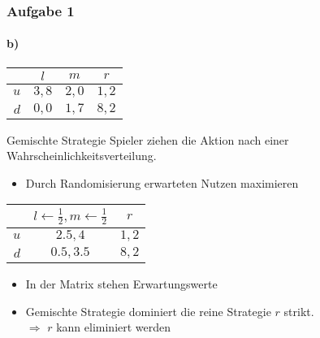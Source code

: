 \documentclass{beamer}
\begin{document}
\begin{frame}
	\frametitle{Aufgabe 1}
	\framesubtitle{b)}

	\centering
	\begin{tabular}{r|c|c|c|}
		& $l$ & $m$ & $r$ \\
		\hline
		$u$ & $3, 8$ & $2, 0$ & $1, 2$ \\
		$d$ & $0, 0$ & $1, 7$ & $8, 2$ \\
		\hline
	\end{tabular}

	\begin{block}{Gemischte Strategie}
		Spieler ziehen die Aktion nach einer Wahrscheinlichkeitsverteilung.
	\end{block}

	\begin{itemize}
		\item Durch Randomisierung erwarteten Nutzen maximieren
	\end{itemize}

	\begin{tabular}{r|c|c|}
		& $l \leftarrow \frac{1}{2}, m \leftarrow \frac{1}{2} $& $r$ \\
		\hline
		$u$ & $2.5, 4$ & $1, 2$ \\
		$d$ & $0.5, 3.5$ & $8, 2$ \\
		\hline
	\end{tabular}

	\begin{itemize}
		\item In der Matrix stehen Erwartungswerte
		\item Gemischte Strategie dominiert die reine Strategie $r$ strikt.\\
		$\Rightarrow$ $r$ kann eliminiert werden
	\end{itemize}

\end{frame}
\end{document}
